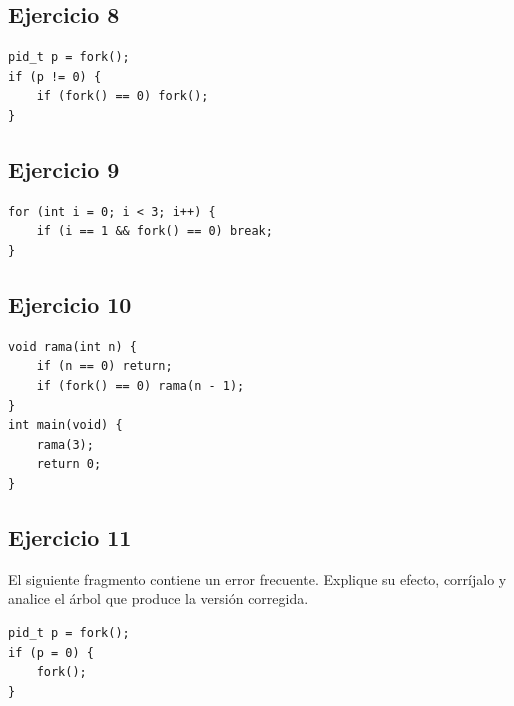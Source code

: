 \documentclass[12pt,a4paper]{article}
\begin{document}
\subsection*{Ejercicio 8}
\begin{lstlisting}
pid_t p = fork();
if (p != 0) {
    if (fork() == 0) fork();
}
\end{lstlisting}
\subsection*{Ejercicio 9}
\begin{lstlisting}
for (int i = 0; i < 3; i++) {
    if (i == 1 && fork() == 0) break;
}
\end{lstlisting}
\subsection*{Ejercicio 10}
\begin{lstlisting}
void rama(int n) {
    if (n == 0) return;
    if (fork() == 0) rama(n - 1);
}
int main(void) {
    rama(3);
    return 0;
}
\end{lstlisting}
\subsection*{Ejercicio 11}
El siguiente fragmento contiene un error frecuente. Explique su efecto, corríjalo y analice el árbol que produce la versión corregida.
\begin{lstlisting}
pid_t p = fork();
if (p = 0) {
    fork();
}
\end{lstlisting}
\end{document}
